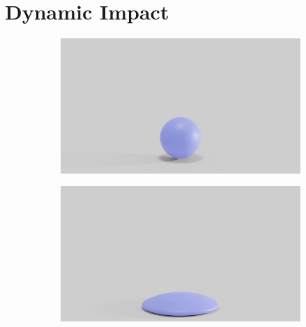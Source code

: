 \section{Dynamic Impact}

\begin{figure}
	\centering
	\begin{subfigure}{.03\linewidth}
	\end{subfigure}%
	\begin{subfigure}{.16\linewidth}
		\centering
		{\includegraphics[width=2.0\textwidth]{images/soft_ball/045/0200.jpg}}
		\label{sfig:ball-045-1}
	\end{subfigure}%
	\begin{subfigure}{.16\linewidth}
		\centering
		{\includegraphics[width=2.0\textwidth]{images/soft_ball/045/0250.jpg}}
		\label{sfig:ball-045-2}
	\end{subfigure}%

\end{figure}
